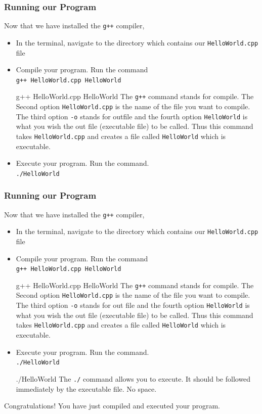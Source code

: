 \documentclass{if-beamer}
\begin{document}
\begin{frame}
\frametitle{Running our Program}
Now that we have installed the \texttt{g++} compiler, 
\begin{itemize}
	\item In the terminal, navigate to the directory which contains our \texttt{HelloWorld.cpp} file
	\item Compile your program. Run the command \\
	\qquad \texttt{g++ HelloWorld.cpp HelloWorld}
	\begin{block}{g++ HelloWorld.cpp HelloWorld}
		The \texttt{g++} command stands for compile. The Second option \texttt{HelloWorld.cpp} is the name of the file you want to compile. The third option \texttt{-o} stands for outfile and the fourth option  \texttt{HelloWorld} is what you wish the out file (executable file) to be called. Thus this command takes \texttt{HelloWorld.cpp} and creates a file called \texttt{HelloWorld} which is executable.
	\end{block}
	\item Execute your program. Run the command.\\
	\qquad \texttt{./HelloWorld} 

\end{itemize} 
\end{frame}

\begin{frame}
\frametitle{Running our Program}
Now that we have installed the \texttt{g++} compiler, 
\begin{itemize}
	\item In the terminal, navigate to the directory which contains our \texttt{HelloWorld.cpp} file
	\item Compile your program. Run the command \\
	\qquad \texttt{g++ HelloWorld.cpp HelloWorld}
	\begin{block}{g++ HelloWorld.cpp HelloWorld}
		The \texttt{g++} command stands for compile. The Second option \texttt{HelloWorld.cpp} is the name of the file you want to compile. The third option \texttt{-o} stands for out file and the fourth option  \texttt{HelloWorld} is what you wish the out file (executable file) to be called. Thus this command takes \texttt{HelloWorld.cpp} and creates a file called \texttt{HelloWorld} which is executable.
	\end{block}
	\item Execute your program. Run the command.\\
	\qquad \texttt{./HelloWorld} 
	\begin{block}{./HelloWorld}
		The \texttt{./} command allows you to execute. It should be followed immediately by the executable file. No space.
	\end{block}
\end{itemize} 
\vspace{2pt}
Congratulations! You have just compiled and executed your program.
\end{frame}
\end{document}
